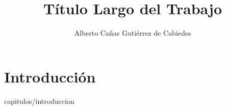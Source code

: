 \documentclass[final, epsbased]{tfgtfmthesisuam}
\title{Título Largo del Trabajo}
\author{Alberto Cañas Gutiérrez de Cabiedes}
\begin{document}
\chapter{Introducción}{capitulos/introduccion}

\printglossary


\end{document}
